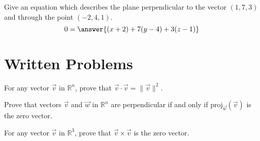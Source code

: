 \documentclass{ximera}
\begin{document}
\begin{problem}
Give an equation which describes the plane perpendicular to the vector $(1,7,3)$ and through the point $(-2,4,1)$.
\[
0=\answer{(x+2)+7(y-4)+3(z-1)}
\]
\end{problem}

\section*{Written Problems}
\begin{problem}
For any vector $\vec{v}$ in $\mathbb{R}^n$, prove that $\vec{v}\cdot\vec{v}=\|\vec{v}\|^2$.
\end{problem}

\begin{problem}
Prove that vectors $\vec{v}$ and $\vec{w}$ in $\mathbb{R}^n$ are perpendicular if and only if $\textrm{proj}_{\vec{w}}(\vec{v})$ is the zero vector.
\end{problem}

\begin{problem}
For any vector $\vec{v}$ in $\mathbb{R}^3$, prove that $\vec{v}\times\vec{v}$ is the zero vector.
\end{problem}
\end{document}
